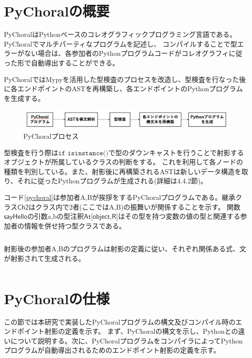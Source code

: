 \documentclass{thesis}
\begin{document}
\section{PyChoralの概要}
PyChoralはPythonベースのコレオグラフィックプログラミング言語である。PyChoralでマルチパーティなプログラムを記述し、
コンパイルすることで型エラーがない場合は、各参加者のPythonプログラムコードがコレオグラフィに従った形で自動導出することができる。

PyChoralではMypyを活用した型検査のプロセスを改造し、型検査を行なった後に各エンドポイントのASTを再構築し、各エンドポイントのPythonプログラムを生成する。
\begin{figure}[H]
  \centering
  \includegraphics[scale=0.45]{image/pychoralprocess.png}
  \caption{PyChoralプロセス}
  \label{pychoralprocess}
\end{figure}

型検査を行う際は$\texttt{if isinstance()}$で型のダウンキャストを行うことで射影するオブジェクトが所属しているクラスの判断をする。
これを利用して各ノードの種類を判別している。また、射影後に再構築されるASTは新しいデータ構造を取り、それに従ったPythonプログラムが生成される(詳細は4.4.2節)。

コード\ref{pychoral}は参加者A,Bが挨拶をするPyChoralプログラムである。継承クラス$\textsf{Ch2}$はクラス内で2者(ここではA,B)の振舞いが関係することを示す。
関数$\textsf{sayHello}$の引数a,bの型注釈$\textsf{At[object,R]}$はその型を持つ変数の値の型と関連する参加者の情報を併せ持つ型クラスである。
\begin{lstlisting}[caption=PyChoral,label=pychoral]

\end{lstlisting}
射影後の参加者A,Bのプログラムは射影の定義に従い、それぞれ関係ある式、文が射影されて生成される。
\begin{lstlisting}[caption=generated Python,label=python]

\end{lstlisting}
\section{PyChoralの仕様}
この節では本研究で実装したPyChoralプログラムの構文及びコンパイル時のエンドポイント射影の定義を示す。
まず、PyChoralの構文を示し、Pythonとの違いについて説明する。次に、PyChoralプログラムをコンパイラによってPython
プログラムが自動導出されるためのエンドポイント射影の定義を示す。
\end{document}
